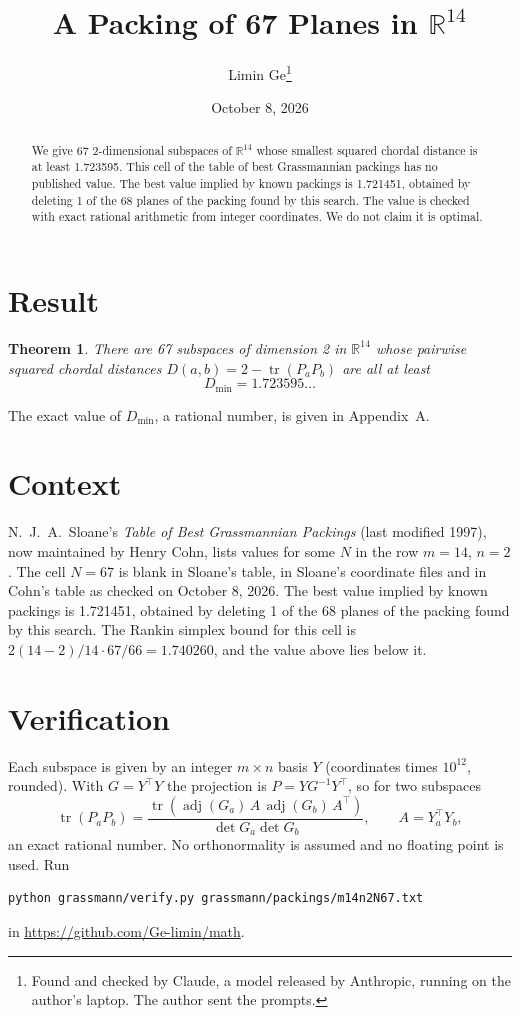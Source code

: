 \documentclass[11pt,a4paper]{article}
\title{A Packing of 67 Planes in $\mathbb{R}^{14}$}
\author{Limin Ge\thanks{Found and checked by Claude, a model released by Anthropic, running on the author's laptop. The author sent the prompts.}}
\date{October 8, 2026}
\newtheorem*{theorem}{Theorem}
\begin{document}
\maketitle
\begin{abstract}
We give 67 2-dimensional subspaces of $\mathbb{R}^{14}$ whose smallest squared chordal distance is at least 1.723595. This cell of the table of best Grassmannian packings has no published value. The best value implied by known packings is 1.721451, obtained by deleting 1 of the 68 planes of the packing found by this search. The value is checked with exact rational arithmetic from integer coordinates. We do not claim it is optimal.
\end{abstract}

\section{Result}
\begin{theorem}
There are 67 subspaces of dimension 2 in $\mathbb{R}^{14}$ whose pairwise squared chordal distances $D(a,b) = 2 - \operatorname{tr}(P_aP_b)$ are all at least
\[ D_{\min} = 1.723595\ldots \]
\end{theorem}
The exact value of $D_{\min}$, a rational number, is given in Appendix~A.


\section{Context}
N.~J.~A.~Sloane's \emph{Table of Best Grassmannian Packings} (last modified 1997), now maintained by Henry Cohn, lists values for some $N$ in the row $m=14$, $n=2$. The cell $N=67$ is blank in Sloane's table, in Sloane's coordinate files and in Cohn's table as checked on October 8, 2026. The best value implied by known packings is 1.721451, obtained by deleting 1 of the 68 planes of the packing found by this search. The Rankin simplex bound for this cell is $2(14-2)/14\cdot 67/66 = 1.740260$, and the value above lies below it.


\section{Verification}
Each subspace is given by an integer $m\times n$ basis $Y$ (coordinates times $10^{12}$, rounded). With $G=Y^\top Y$ the projection is $P=YG^{-1}Y^\top$, so for two subspaces
\[ \operatorname{tr}(P_aP_b)=\frac{\operatorname{tr}(\operatorname{adj}(G_a)\,A\,\operatorname{adj}(G_b)\,A^\top)}{\det G_a\det G_b},\qquad A=Y_a^\top Y_b, \]
an exact rational number. No orthonormality is assumed and no floating point is used. Run
\begin{verbatim}
python grassmann/verify.py grassmann/packings/m14n2N67.txt
\end{verbatim}
in \url{https://github.com/Ge-limin/math}.
\end{document}

